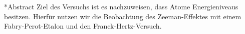 \documentclass[pdftex, a4paper,11pt, twoside, ngerman]{report}
\begin{document}
  
  
  
  
  
  
  
  
  \begin{chapter}*{Abstract}
    Ziel des Versuchs ist es nachzuweisen, dass Atome Energieniveaus besitzen.
    Hierfür nutzen wir die Beobachtung des Zeeman-Effektes mit einem Fabry-Perot-Etalon und den Franck-Hertz-Versuch.

    
    
  \end{chapter}
  
  \tableofcontents
  
  
  
\end{document}
